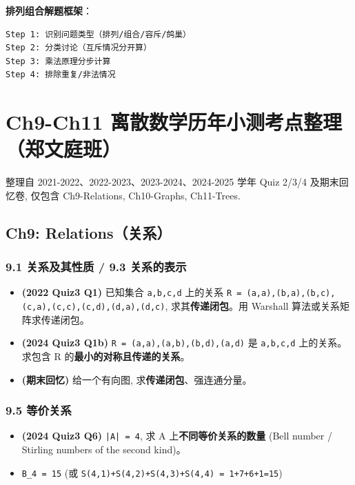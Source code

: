 \documentclass[10pt,a4paper,openany]{ctexbook}
\theoremstyle{definition}
\theoremstyle{remark}
\renewenvironment{quote}
  {\list{}{\leftmargin=1em\rightmargin=0pt\topsep=0.5pt\partopsep=0pt}\item[]}
  {\endlist}
\begin{document}
\textbf{排列组合解题框架}：
{\footnotesize\begin{verbatim}
Step 1: 识别问题类型（排列/组合/容斥/鸽巢）
Step 2: 分类讨论（互斥情况分开算）
Step 3: 乘法原理分步计算
Step 4: 排除重复/非法情况
\end{verbatim}}

\section{Ch9-Ch11 离散数学历年小测考点整理（郑文庭班）}

\begin{quote}
整理自 2021-2022、2022-2023、2023-2024、2024-2025 学年 Quiz 2/3/4 及期末回忆卷, 仅包含 Ch9-Relations, Ch10-Graphs, Ch11-Trees.

\end{quote}
\vspace{-2pt}

\subsection{Ch9: Relations（关系）}

\subsubsection{9.1 关系及其性质 / 9.3 关系的表示}

\begin{itemize}
\item \textbf{(2022 Quiz3 Q1)} 已知集合 \texttt{{a,b,c,d}} 上的关系 \texttt{R = {(a,a),(b,a),(b,c),(c,a),(c,c),(c,d),(d,a),(d,c)}}, 求其\textbf{传递闭包}。用 Warshall 算法或关系矩阵求传递闭包。
\item \textbf{(2024 Quiz3 Q1b)} \texttt{R = {(a,a),(a,b),(b,d),(a,d)}} 是 \texttt{{a,b,c,d}} 上的关系。求包含 R 的\textbf{最小的对称且传递的关系}。
\item \textbf{(期末回忆)} 给一个有向图, 求\textbf{传递闭包}、强连通分量。

\end{itemize}

\subsubsection{9.5 等价关系}

\begin{itemize}
\item \textbf{(2024 Quiz3 Q6)} \texttt{|A| = 4}, 求 A 上\textbf{不同等价关系的数量} (Bell number / Stirling numbers of the second kind)。
\item \texttt{B\_4 = 15} (或 \texttt{S(4,1)+S(4,2)+S(4,3)+S(4,4) = 1+7+6+1=15})

\end{itemize}
\end{document}
